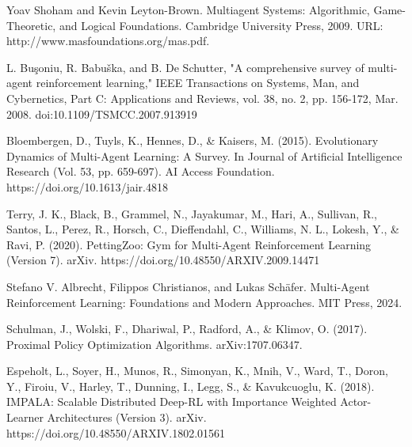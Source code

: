\documentclass[12pt,a4paper, onecolumn]{exam}
\begin{document}
\begin{thebibliography}{9}
    Yoav Shoham and Kevin Leyton-Brown. Multiagent Systems: Algorithmic, Game-Theoretic, and Logical Foundations. Cambridge University Press, 2009. URL: http://www.masfoundations.org/mas.pdf.

    L. Buşoniu, R. Babuška, and B. De Schutter, "A comprehensive survey of multi-agent reinforcement learning," IEEE Transactions on Systems, Man, and Cybernetics, Part C: Applications and Reviews, vol. 38, no. 2, pp. 156-172, Mar. 2008. doi:10.1109/TSMCC.2007.913919

    Bloembergen, D., Tuyls, K., Hennes, D., \& Kaisers, M. (2015). Evolutionary Dynamics of Multi-Agent Learning: A Survey. In Journal of Artificial Intelligence Research (Vol. 53, pp. 659-697). AI Access Foundation. https://doi.org/10.1613/jair.4818

    Terry, J. K., Black, B., Grammel, N., Jayakumar, M., Hari, A., Sullivan, R., Santos, L., Perez, R., Horsch, C., Dieffendahl, C., Williams, N. L., Lokesh, Y., \& Ravi, P. (2020). PettingZoo: Gym for Multi-Agent Reinforcement Learning (Version 7). arXiv. https://doi.org/10.48550/ARXIV.2009.14471

    Stefano V. Albrecht, Filippos Christianos, and Lukas Schäfer. Multi-Agent Reinforcement Learning: Foundations and Modern Approaches. MIT Press, 2024.

    Schulman, J., Wolski, F., Dhariwal, P., Radford, A., \& Klimov, O. (2017). Proximal Policy Optimization Algorithms. arXiv:1707.06347.

    Espeholt, L., Soyer, H., Munos, R., Simonyan, K., Mnih, V., Ward, T., Doron, Y., Firoiu, V., Harley, T., Dunning, I., Legg, S., \& Kavukcuoglu, K. (2018). IMPALA: Scalable Distributed Deep-RL with Importance Weighted Actor-Learner Architectures (Version 3). arXiv. https://doi.org/10.48550/ARXIV.1802.01561

\end{thebibliography}


\newpage
\end{document}
